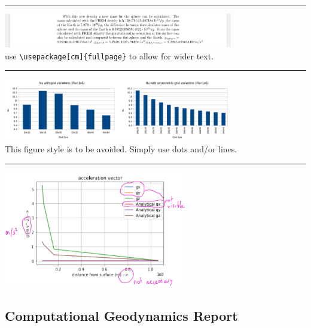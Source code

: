 \par\noindent\rule{\textwidth}{0.4pt}
\begin{center}
\includegraphics[width=10cm]{images/grading/width}\\
use \verb!\usepackage[cm]{fullpage}! to allow for wider text.
\end{center}

\par\noindent\rule{\textwidth}{0.4pt}
\begin{center}
\includegraphics[width=10cm]{images/grading/figs1}\\
This figure style is to be avoided. Simply use dots and/or lines.
\end{center}

\par\noindent\rule{\textwidth}{0.4pt}
\begin{center}
\includegraphics[width=8cm]{images/grading/figs2}
\end{center}

\subsection{Computational Geodynamics Report}

